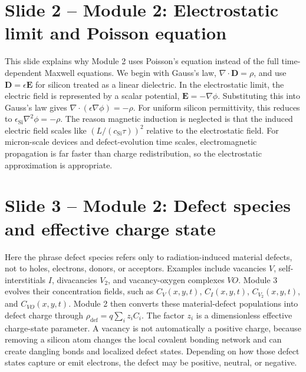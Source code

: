 \documentclass[11pt]{article}
\newcommand{\grad}{\nabla}
\newcommand{\divg}{\nabla\!\cdot}
\newcommand{\E}{\bm{E}}
\newcommand{\epsSi}{\epsilon_{\mathrm{Si}}}
\newcommand{\vect}[1]{\bm{#1}}
\begin{document}
\section*{Slide 2 -- Module 2: Electrostatic limit and Poisson equation}
\begin{scriptbox}
This slide explains why Module 2 uses Poisson's equation instead of the full time-dependent Maxwell equations. We begin with Gauss's law, \(\divg\vect{D}=\rho\), and use \(\vect{D}=\epsilon\E\) for silicon treated as a linear dielectric. In the electrostatic limit, the electric field is represented by a scalar potential, \(\E=-\grad\phi\). Substituting this into Gauss's law gives \(\divg(\epsilon\grad\phi)=-\rho\). For uniform silicon permittivity, this reduces to \(\epsSi\grad^2\phi=-\rho\). The reason magnetic induction is neglected is that the induced electric field scales like \((L/(c_{\mathrm{Si}}\tau))^2\) relative to the electrostatic field. For micron-scale devices and defect-evolution time scales, electromagnetic propagation is far faster than charge redistribution, so the electrostatic approximation is appropriate.
\end{scriptbox}

\section*{Slide 3 -- Module 2: Defect species and effective charge state}
\begin{scriptbox}
Here the phrase defect species refers only to radiation-induced material defects, not to holes, electrons, donors, or acceptors. Examples include vacancies \(V\), self-interstitials \(I\), divacancies \(V_2\), and vacancy-oxygen complexes \(VO\). Module 3 evolves their concentration fields, such as \(C_V(x,y,t)\), \(C_I(x,y,t)\), \(C_{V_2}(x,y,t)\), and \(C_{VO}(x,y,t)\). Module 2 then converts these material-defect populations into defect charge through \(\rho_{\mathrm{def}}=q\sum_i z_iC_i\). The factor \(z_i\) is a dimensionless effective charge-state parameter. A vacancy is not automatically a positive charge, because removing a silicon atom changes the local covalent bonding network and can create dangling bonds and localized defect states. Depending on how those defect states capture or emit electrons, the defect may be positive, neutral, or negative.
\end{scriptbox}
\end{document}
